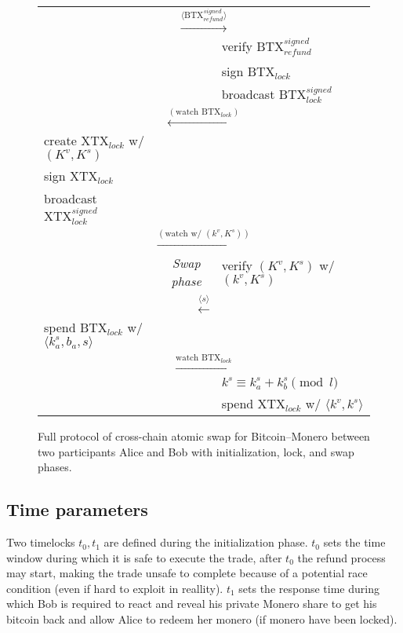 \documentclass{llncs}
\begin{document}
\begin{figure}[H]
\begin{table}[H]
{\begin{tabular}{ | l c l | }
          \multicolumn{3}{|c|}{$\xrightarrow{\langle \text{BTX}_\textit{refund}^\textit{signed} \rangle}$} \\
          & & verify $\text{BTX}_\textit{refund}^\textit{signed}$ \\
          & & sign $\text{BTX}_\textit{lock}$ \\
          & & broadcast $\text{BTX}_\textit{lock}^\textit{signed}$ \\
          \multicolumn{3}{|c|}{$\xleftarrow{(\text{watch BTX}_\textit{lock})}$} \\
          create $\text{XTX}_\textit{lock}$ w/ $(K^v, K^s)$ & & \\
          sign $\text{XTX}_\textit{lock}$ & & \\
          broadcast $\text{XTX}_\textit{lock}^\textit{signed}$ & & \\
          \multicolumn{3}{|c|}{$\xrightarrow{(\text{watch w/ } (k^v, K^s))}$} \\
          & \textit{Swap phase} & verify $(K^v, K^s)$ w/ $(k^v, K^s)$ \\
          \multicolumn{3}{|c|}{$\xleftarrow{\langle s \rangle}$} \\
          spend $\text{BTX}_\textit{lock}$ w/ $\langle k^s_a, b_a, s \rangle$ & & \\
          \multicolumn{3}{|c|}{$\xrightarrow{\text{watch BTX}_\textit{lock}}$} \\
          & & $k^s \equiv k^s_a + k^s_b \pmod l$ \\
          & & spend $\text{XTX}_\textit{lock}$ w/ $\langle k^v, k^s \rangle$ \\
        \hline
      \end{tabular}}
    \end{table}
  \caption{Full protocol of cross-chain atomic swap for Bitcoin--Monero between two participants Alice and Bob with initialization, lock, and swap phases.}
  \label{fig:protocol}
\end{figure}

\subsection{Time parameters}
Two timelocks $t_0, t_1$ are defined during the initialization phase. $t_0$ sets the time window during which it is safe to execute the trade, after $t_0$ the refund process may start, making the trade unsafe to complete because of a potential race condition (even if hard to exploit in reallity). $t_1$ sets the response time during which Bob is required to react and reveal his private Monero share to get his bitcoin back and allow Alice to redeem her monero (if monero have been locked).
\end{document}
